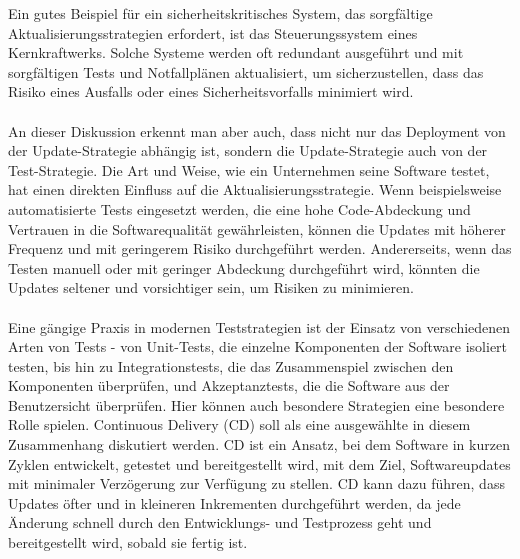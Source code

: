 \documentclass[../vs-script-first-v01.tex]{subfiles}
\begin{document}
Ein gutes Beispiel für ein sicherheitskritisches System, das sorgfältige Aktualisierungsstrategien erfordert, ist das Steuerungssystem eines Kernkraftwerks. Solche Systeme werden oft redundant ausgeführt und mit sorgfältigen Tests und Notfallplänen aktualisiert, um sicherzustellen, dass das Risiko eines Ausfalls oder eines Sicherheitsvorfalls minimiert wird. 
\\\\ 
An dieser Diskussion erkennt man aber auch, dass nicht nur das Deployment von der Update-Strategie abhängig ist, sondern die Update-Strategie auch von der Test-Strategie. Die Art und Weise, wie ein Unternehmen seine Software testet, hat einen direkten Einfluss auf die Aktualisierungsstrategie. Wenn beispielsweise automatisierte Tests eingesetzt werden, die eine hohe Code-Abdeckung und Vertrauen in die Softwarequalität gewährleisten, können die Updates mit höherer Frequenz und mit geringerem Risiko durchgeführt werden. Andererseits, wenn das Testen manuell oder mit geringer Abdeckung durchgeführt wird, könnten die Updates seltener und vorsichtiger sein, um Risiken zu minimieren.
\\\\
Eine gängige Praxis in modernen Teststrategien ist der Einsatz von verschiedenen Arten von Tests - von Unit-Tests, die einzelne Komponenten der Software isoliert testen, bis hin zu Integrationstests, die das Zusammenspiel zwischen den Komponenten überprüfen, und Akzeptanztests, die die Software aus der Benutzersicht überprüfen.
Hier können auch besondere Strategien eine besondere Rolle spielen. Continuous Delivery (CD) soll als eine ausgewählte in diesem Zusammenhang diskutiert werden. CD ist ein Ansatz, bei dem Software in kurzen Zyklen entwickelt, getestet und bereitgestellt wird, mit dem Ziel, Softwareupdates mit minimaler Verzögerung zur Verfügung zu stellen. CD kann dazu führen, dass Updates öfter und in kleineren Inkrementen durchgeführt werden, da jede Änderung schnell durch den Entwicklungs- und Testprozess geht und bereitgestellt wird, sobald sie fertig ist.
\end{document}
